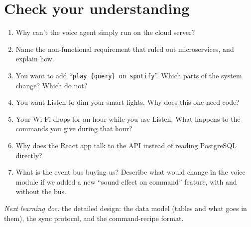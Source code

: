 \documentclass[11pt,a4paper]{article}
\begin{document}
\section{Check your understanding}
\begin{exercise}
\begin{enumerate}
  \item Why can't the voice agent simply run on the cloud server?
  \item Name the non-functional requirement that ruled out microservices, and explain how.
  \item You want to add ``\texttt{play \{query\} on spotify}''. Which parts of the system
        change? Which do not?
  \item You want Listen to dim your smart lights. Why does this one need code?
  \item Your Wi-Fi drops for an hour while you use Listen. What happens to the commands you
        give during that hour?
  \item Why does the React app talk to the API instead of reading PostgreSQL directly?
  \item What is the event bus buying us? Describe what would change in the voice module if
        we added a new ``sound effect on command'' feature, with and without the bus.
\end{enumerate}
\end{exercise}

\noindent\emph{Next learning doc:} the detailed design: the data model (tables and what goes
in them), the sync protocol, and the command-recipe format.
\end{document}
